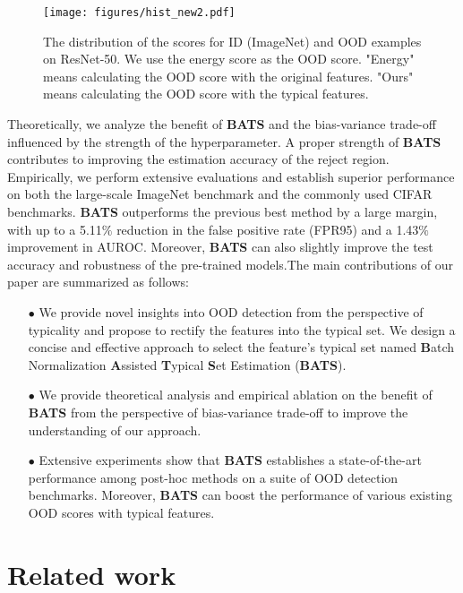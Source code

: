 \documentclass{article}
\begin{document}
\begin{figure}[htbp]
\centering
\texttt{[image: figures/hist\_new2.pdf]}
\vspace{-0.4cm}
\caption{The distribution of the scores for ID (ImageNet) and OOD examples on ResNet-50. We use the energy score \cite{liu2020energy} as the OOD score. "Energy" means calculating the OOD score with the original features. "Ours" means calculating the OOD score with the typical features.}
\label{img:hist}
\end{figure}

Theoretically, we analyze the benefit of \textbf{BATS} and the bias-variance trade-off influenced by the strength of the hyperparameter. A proper strength of \textbf{BATS} contributes to improving the estimation accuracy of the reject region. Empirically, we perform extensive evaluations and establish superior performance on both the large-scale ImageNet benchmark and the commonly used CIFAR benchmarks. \textbf{BATS} outperforms the previous best method by a large margin, with up to a 5.11$\%$ reduction in the false positive rate (FPR95) and a 1.43$\%$ improvement in AUROC. Moreover, \textbf{BATS} can also slightly improve the test accuracy and robustness of the pre-trained models.The main contributions of our paper are summarized as follows:
 \begin{itemize}
 \item[$\bullet$] We provide novel insights into OOD detection from the perspective of typicality and propose to rectify the features into the typical set. We design a concise and effective approach to select the feature's typical set named \textbf{B}atch Normalization \textbf{A}ssisted \textbf{T}ypical \textbf{S}et Estimation (\textbf{BATS}). 
 \item[$\bullet$] We provide theoretical analysis and empirical ablation on the benefit of \textbf{BATS} from the perspective of bias-variance trade-off to improve the understanding of our approach.
 \item[$\bullet$] Extensive experiments show that \textbf{BATS} establishes a state-of-the-art performance among post-hoc methods on a suite of OOD detection benchmarks. Moreover, \textbf{BATS} can boost the performance of various existing OOD scores with typical features.
 \end{itemize}


\section{Related work}
\end{document}
